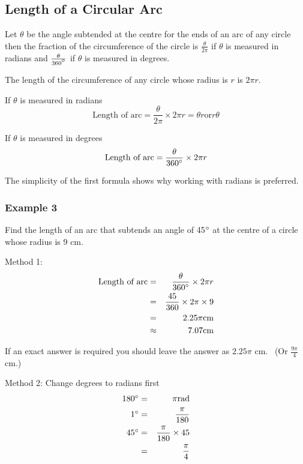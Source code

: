 \subsection{Length of a Circular Arc}
Let $\theta $ be the angle subtended at the centre for the ends of an arc of any circle then the fraction of the circumference of the
circle is $\frac{\theta }{2 \pi }$ if $\theta $ is measured in radians and $\frac{\theta }{360 \mbox{{\ensuremath{{}^\circ}}}}$ if $\theta $ is measured in degrees. 

The length of the circumference of any circle whose radius is $r$ is $2 \pi  r$. 

If $\theta $ is measured in radians
\begin{equation*}\text{Length of arc} =\frac{\theta }{2 \pi } \times 2 \pi  r =\theta  r\text{or}r \theta 
\end{equation*}

If $\theta $ is measured in degrees
\begin{equation*}\text{Length of arc} =\frac{\theta }{360 \mbox{{\ensuremath{{}^\circ}}}} \times 2 \pi  r
\end{equation*}

The simplicity of the first formula shows why working with radians is preferred. 

\subsubsection{Example 3}
Find the length of an arc that subtends an angle of 45$\mbox{{\ensuremath{{}^\circ}}}$ at the centre of a circle whose radius is 9 $\mbox{cm}\text{.}$ 

Method 1:
\begin{align*}\text{Length of arc} &  = & \frac{\theta }{360 \mbox{{\ensuremath{{}^\circ}}}} \times 2 \pi  r \\
 &  = & \frac{45}{360} \times 2 \pi  \times 9 \\
 &  = & 2.25 \pi \text{}\mbox{cm} \\
 &  \approx  & 7.07\text{}\mbox{cm}\end{align*}

If an exact answer is required you should leave the answer as $2.25 \pi $ $\mbox{cm}$. \ (Or $\frac{9 \pi }{4}$ $\mbox{cm}\text{.}$) 

Method 2: Change degrees to radians first
\begin{align*}180 \mbox{{\ensuremath{{}^\circ}}} &  = & \pi \text{}\mbox{rad} \\
1 \mbox{{\ensuremath{{}^\circ}}} &  = & \frac{\pi }{180} \\
45 \mbox{{\ensuremath{{}^\circ}}} &  = & \frac{\pi }{180} \times 45 \\
 &  = & \frac{\pi }{4}\end{align*}


